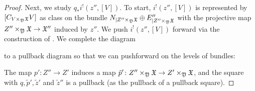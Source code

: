 \documentclass[a4paper,12pt]{article} %
\theoremstyle{definition}
\theoremstyle{plain}%
\begin{document}
\begin{proof}
Next, we study $q_*i^!(z'',[V])$. 
To start, $i^!(z'',[V])$ is represented by $[C_{V\times_{\frak Y} \frak X} V]$ as class on the bundle $N_{\mid Z'' \times_{\frak Y} \frak X} \oplus E''_{\mid Z'' \times_{\frak Y} \frak X}$   with the projective map $Z'' \times_{\frak Y} \frak X \to \frak X''$ induced by $z''$.
We push $i^!(z'',[V])$
forward via the construction of \cite[Appendix B]{BaeSchmitt1}. We complete the diagram
\begin{center}
\end{center}
to a pullback diagram so that we can pushforward on the levels of bundles: %
\begin{center}
\end{center}
The map $p'\colon Z'' \to Z'$ induces a map $\tilde{p}'\colon Z'' \times_{\frak Y} \frak X  \to Z' \times_{\frak Y} \frak X $, and the square with $q, \tilde{p}', \tilde{z}'$ and $\tilde{z}''$ is a pullback (as the pullback of a pullback square). 


\end{proof}
\end{document}
